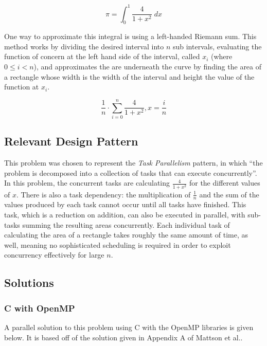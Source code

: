 \begin{equation} \label{eq::pi_int}
\pi = \int_0^1 \frac{4}{1 + x^2} \; dx
\end{equation}

\noindent One way to approximate this integral is using a left-handed Riemann sum. 
This method works by dividing the desired interval into $n$ sub intervals, 
evaluating the function of concern at the left hand side of the interval, called $x_i$ (where $0 \le i < n$), 
and approximates the are underneath the curve by finding the area of a rectangle 
whose width is the width of the interval and height the value of the function at $x_i$.

\[\frac{1}{n} \cdot \sum_{i=0}^n \frac{4}{1 + x^2}, x = \frac{i}{n} \]

\subsection{Relevant Design Pattern}
This problem was chosen to represent the \textit{Task Parallelism} pattern, 
in which ``the problem is decomposed into a collection of tasks that can execute concurrently''\cite{mass}.
In this problem, the concurrent tasks are calculating $\frac{4}{1 + x^2}$ for the different values of $x$. 
There is also a task dependency: the multiplication of $\frac{1}{n}$ and the sum of the values produced by each task 
cannot occur until all tasks have finished. 
This task, which is a reduction on addition, can also be executed in parallel, 
with sub-tasks summing the resulting areas concurrently.
Each individual task of calculating the area of a rectangle takes roughly the same amount of time, as well, 
meaning no sophisticated scheduling is required in order to exploit concurrency effectively for large $n$.

\subsection{Solutions}
\subsubsection{C with OpenMP}
A parallel solution to this problem using C with the OpenMP libraries is given below. 
It is based off of the solution given in Appendix A of Mattson et al.\cite{mass}.

\begin{singlespacing}
\begin{small}

\end{small}
\end{singlespacing}

